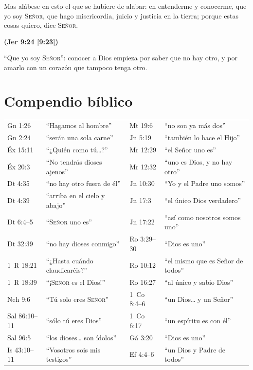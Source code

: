 \documentclass[11pt,letterpaper]{article}
\newcommand{\SENOR}{\textsc{Señor}}
\newcommand{\fuente}[1]{\par\hfill{\upshape\bfseries\small\textcolor{azul}{#1}}}
\begin{document}
\begin{cita}Mas alábese en esto el que se hubiere de alabar: en entenderme y conocerme, que yo soy \SENOR{}, que hago misericordia, juicio y justicia en la tierra; porque estas cosas quiero, dice \SENOR{}.\fuente{(Jer 9:24 [9:23])}\end{cita}

``Que yo soy \SENOR'': conocer a Dios empieza por saber que no hay otro, y por amarlo con un corazón que tampoco tenga otro.

\section*{Compendio bíblico}
\begin{center}\small\renewcommand{\arraystretch}{1.12}
\begin{tabular}{@{}L{2.2cm}L{5.0cm}|L{2.2cm}L{5.0cm}@{}}
\toprule
Gn 1:26 & ``Hagamos al hombre'' & Mt 19:6 & ``no son ya más dos'' \\
Gn 2:24 & ``serán una sola carne'' & Jn 5:19 & ``también lo hace el Hijo'' \\
Éx 15:11 & ``¿Quién como tú\ldots?'' & Mr 12:29 & ``el Señor uno es'' \\
Éx 20:3 & ``No tendrás dioses ajenos'' & Mr 12:32 & ``uno es Dios, y no hay otro'' \\
Dt 4:35 & ``no hay otro fuera de él'' & Jn 10:30 & ``Yo y el Padre uno somos'' \\
Dt 4:39 & ``arriba en el cielo y abajo'' & Jn 17:3 & ``el único Dios verdadero'' \\
Dt 6:4--5 & ``\SENOR{} uno es'' & Jn 17:22 & ``así como nosotros somos uno'' \\
Dt 32:39 & ``no hay dioses conmigo'' & Ro 3:29--30 & ``Dios es uno'' \\
1~R 18:21 & ``¿Hasta cuándo claudicaréis?'' & Ro 10:12 & ``el mismo que es Señor de todos'' \\
1~R 18:39 & ``¡\SENOR{} es el Dios!'' & Ro 16:27 & ``al único y sabio Dios'' \\
Neh 9:6 & ``Tú solo eres \SENOR'' & 1~Co 8:4--6 & ``un Dios\ldots{} y un Señor'' \\
Sal 86:10--11 & ``sólo tú eres Dios'' & 1~Co 6:17 & ``un espíritu es con él'' \\
Sal 96:5 & ``los dioses\ldots{} son ídolos'' & Gá 3:20 & ``Dios es uno'' \\
Is 43:10--11 & ``Vosotros sois mis testigos'' & Ef 4:4--6 & ``un Dios y Padre de todos'' \\

\end{tabular}
\end{center}
\end{document}
